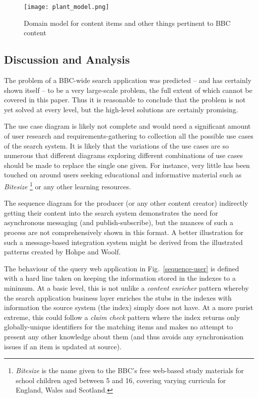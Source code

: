 \documentclass{llncs}
\begin{document}
\begin{figure}
  \begin{center}
    \texttt{[image: plant\_model.png]}
  \end{center}
  \caption{Domain model for content items and other things pertinent to BBC content\label{model}}
\end{figure}

\subsection{Discussion and Analysis}
\label{appraisal}

The problem of
a BBC-wide search application was predicted --
and has certainly shown itself -- to be a very large-scale problem, the
full extent of which cannot be covered in this paper. Thus it
is reasonable to conclude that the problem is not yet solved
at every level, but the high-level solutions are certainly promising.

The use case diagram is likely not complete and would need
a significant amount of user research and requirements-gathering
to collection all the possible use cases of the search system. It
is likely that the variations of the use cases are so numerous
that different diagrams exploring different combinations of use
cases should be made to replace the single one given. For instance,
very little has been touched on around users seeking educational
and informative material such as \emph{Bitesize}
\footnote{\emph{Bitesize} is the name given to the BBC's free web-based
study materials for school children aged between
5 and 16, covering varying curricula for England, Wales and Scotland.}
or any other learning resources.

The sequence diagram for the producer (or any other content creator)
indirectly getting their content into the search system demonstrates
the need for asynchronous messaging (and publish-subscribe), but
the nuances of such a process are not comprehensively shown in
this format. A better illustration for such a message-based integration
system might be derived from the illustrated patterns created
by Hohpe and Woolf.\cite{hohpe2004enterprise}

The behaviour of the query web application in Fig.~\ref{sequence-user}
is defined with a hard line
taken on keeping the information stored in the indexes to a minimum.
At a basic level, this is not unlike a \emph{content enricher} pattern
\cite{hohpe2004enterprise} whereby the search application
business layer enriches the stubs in the indexes with information
the source system (the index) simply does not have. At a more purist
extreme, this could follow a \emph{claim check} pattern where
the index returns only globally-unique identifiers for the matching
items and makes no attempt to present any other knowledge about them
(and thus avoids any synchronisation issues if an item is updated at
source).
\end{document}

